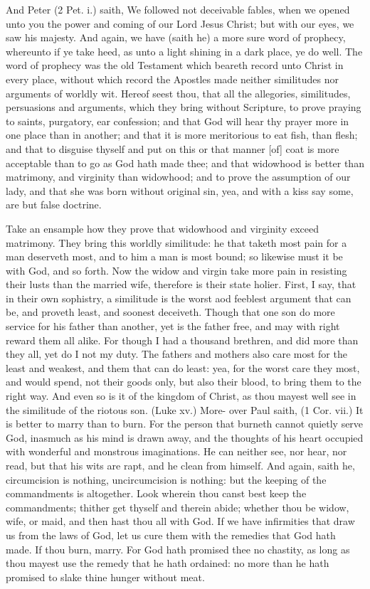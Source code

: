 And Peter (2 Pet. i.) saith, We followed not deceivable
fables, when we opened unto you the power and
coming of our Lord Jesus Christ; but with our eyes, we
saw his majesty. And again, we have (saith he) a more 
sure word of prophecy, whereunto if ye take heed, as 
unto a light shining in a dark place, ye do well. The 
word of prophecy was the old Testament which beareth 
record unto Christ in every place, without which record 
the Apostles made neither similitudes nor arguments of 
worldly wit. Hereof seest thou, that all the allegories, 
similitudes, persuasions and arguments, which they bring 
without Scripture, to prove praying to saints, purgatory, 
ear confession; and that God will hear thy prayer more 
in one place than in another; and that it is more meritorious 
to eat fish, than flesh; and that to disguise thyself and put 
on this or that manner [of] coat is more acceptable than to go 
as God hath made thee; and that widowhood is better than 
matrimony, and virginity than widowhood; and to prove 
the assumption of our lady, and that she was born without 
original sin, yea, and with a kiss say some, are but false 
doctrine. 

Take an ensample how they prove that widowhood and 
virginity exceed matrimony. They bring this worldly similitude:
he that taketh most pain for a man deserveth 
most, and to him a man is most bound; so likewise must 
it be with God, and so forth. Now the widow and virgin 
take more pain in resisting their lusts than the married wife, 
therefore is their state holier. First, I say, that in their 
own sophistry, a similitude is the worst aod feeblest argument
that can be, and proveth least, and soonest deceiveth. 
Though that one son do more service for his father than 
another, yet is the father free, and may with right reward 
them all alike. For though I had a thousand brethren, 
and did more than they all, yet do I not my duty. The 
fathers and mothers also care most for the least and weakest,
and them that can do least: yea, for the worst care 
they most, and would spend, not their goods only, but also 
their blood, to bring them to the right way. And even so 
is it of the kingdom of Christ, as thou mayest well see in 
the similitude of the riotous son. (Luke xv.) More- 
over Paul saith, (1 Cor. vii.) It is better to marry than 
to burn. For the person that burneth cannot quietly serve 
God, inasmuch as his mind is drawn away, and the thoughts 
of his heart occupied with wonderful and monstrous imaginations.
He can neither see, nor hear, nor read, but 
that his wits are rapt, and he clean from himself. And 
again, saith he, circumcision is nothing, uncircumcision is 
nothing: but the keeping of the commandments is altogether. 
Look wherein thou canst best keep the commandments; 
thither get thyself and therein abide; whether thou be 
widow, wife, or maid, and then hast thou all with God.
If we have infirmities that draw us from the laws of God,
let us cure them with the remedies that God hath made.
If thou burn, marry. For God hath promised thee no
chastity, as long as thou mayest use the remedy that he
hath ordained: no more than he hath promised to slake
thine hunger without meat.


